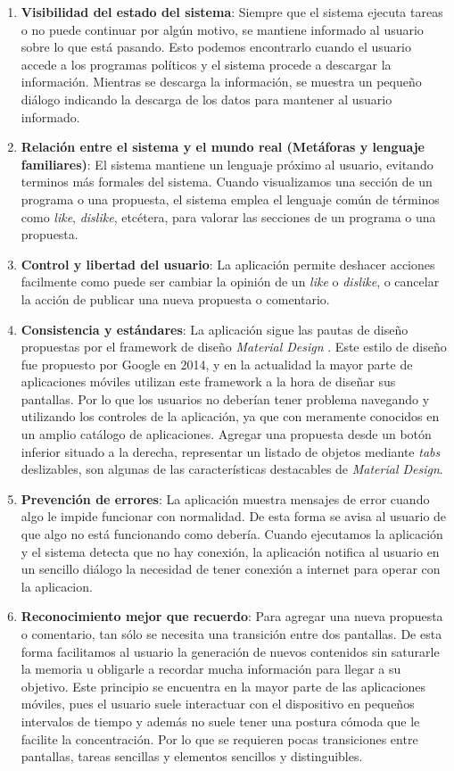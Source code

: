 \begin{enumerate}
  \item \textbf{Visibilidad del estado del sistema}: Siempre que el sistema ejecuta tareas o no puede continuar por algún motivo, se mantiene informado al usuario sobre lo que está pasando. Esto podemos encontrarlo cuando el usuario accede a los programas políticos y el sistema procede a descargar la información. Mientras se descarga la información, se muestra un pequeño diálogo indicando la descarga de los datos para mantener al usuario informado.
  \item \textbf{Relación entre el sistema y el mundo real (Metáforas y lenguaje familiares)}: El sistema mantiene un lenguaje próximo al usuario, evitando terminos más formales del sistema. Cuando visualizamos una sección de un programa o una propuesta, el sistema emplea el lenguaje común de términos como \textit{like}, \textit{dislike}, etcétera, para valorar las secciones de un programa o una propuesta.
  \item \textbf{Control y libertad del usuario}: La aplicación permite deshacer acciones facilmente como puede ser cambiar la opinión de un \textit{like} o \textit{dislike}, o cancelar la acción de publicar una nueva propuesta o comentario.
  \item \textbf{Consistencia y estándares}: La aplicación sigue las pautas de diseño propuestas por el framework de diseño \textit{Material Design} \cite{ref:materialdesign}. Este estilo de diseño fue propuesto por Google en 2014, y en la actualidad la mayor parte de aplicaciones móviles utilizan este framework a la hora de diseñar sus pantallas. Por lo que los usuarios no deberían tener problema navegando y utilizando los controles de la aplicación, ya que con meramente conocidos en un amplio catálogo de aplicaciones. Agregar una propuesta desde un botón inferior situado a la derecha, representar un listado de objetos mediante \textit{tabs} deslizables, son algunas de las características destacables de \textit{Material Design}.
  \item \textbf{Prevención de errores}: La aplicación muestra mensajes de error cuando algo le impide funcionar con normalidad. De esta forma se avisa al usuario de que algo no está funcionando como debería. Cuando ejecutamos la aplicación y el sistema detecta que no hay conexión, la aplicación notifica al usuario en un sencillo diálogo la necesidad de tener conexión a internet para operar con la aplicacion.
  \item \textbf{Reconocimiento mejor que recuerdo}: Para agregar una nueva propuesta o comentario, tan sólo se necesita una transición entre dos pantallas. De esta forma facilitamos al usuario la generación de nuevos contenidos sin saturarle la memoria u obligarle a recordar mucha información para llegar a su objetivo. Este principio se encuentra en la mayor parte de las aplicaciones móviles, pues el usuario suele interactuar con el dispositivo en pequeños intervalos de tiempo y además no suele tener una postura cómoda que le facilite la concentración. Por lo que se requieren pocas transiciones entre pantallas, tareas sencillas y elementos sencillos y distinguibles.

\end{enumerate}
